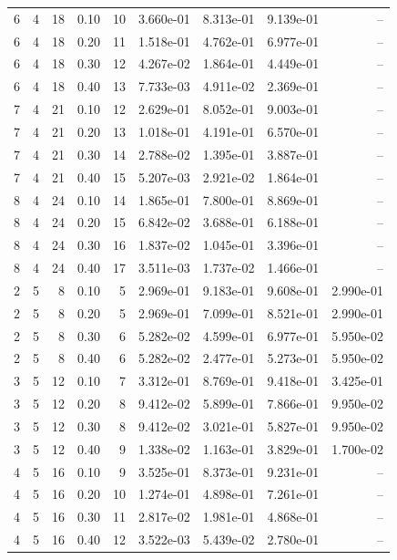 \begin{landscape}
\begin{longtable}{rrrrrrrrr}
6 & 4 & 18 & 0.10 & 10 & 3.660e-01 & 8.313e-01 & 9.139e-01 & -- \\
6 & 4 & 18 & 0.20 & 11 & 1.518e-01 & 4.762e-01 & 6.977e-01 & -- \\
6 & 4 & 18 & 0.30 & 12 & 4.267e-02 & 1.864e-01 & 4.449e-01 & -- \\
6 & 4 & 18 & 0.40 & 13 & 7.733e-03 & 4.911e-02 & 2.369e-01 & -- \\
7 & 4 & 21 & 0.10 & 12 & 2.629e-01 & 8.052e-01 & 9.003e-01 & -- \\
7 & 4 & 21 & 0.20 & 13 & 1.018e-01 & 4.191e-01 & 6.570e-01 & -- \\
7 & 4 & 21 & 0.30 & 14 & 2.788e-02 & 1.395e-01 & 3.887e-01 & -- \\
7 & 4 & 21 & 0.40 & 15 & 5.207e-03 & 2.921e-02 & 1.864e-01 & -- \\
8 & 4 & 24 & 0.10 & 14 & 1.865e-01 & 7.800e-01 & 8.869e-01 & -- \\
8 & 4 & 24 & 0.20 & 15 & 6.842e-02 & 3.688e-01 & 6.188e-01 & -- \\
8 & 4 & 24 & 0.30 & 16 & 1.837e-02 & 1.045e-01 & 3.396e-01 & -- \\
8 & 4 & 24 & 0.40 & 17 & 3.511e-03 & 1.737e-02 & 1.466e-01 & -- \\
2 & 5 & 8 & 0.10 & 5 & 2.969e-01 & 9.183e-01 & 9.608e-01 & 2.990e-01 \\
2 & 5 & 8 & 0.20 & 5 & 2.969e-01 & 7.099e-01 & 8.521e-01 & 2.990e-01 \\
2 & 5 & 8 & 0.30 & 6 & 5.282e-02 & 4.599e-01 & 6.977e-01 & 5.950e-02 \\
2 & 5 & 8 & 0.40 & 6 & 5.282e-02 & 2.477e-01 & 5.273e-01 & 5.950e-02 \\
3 & 5 & 12 & 0.10 & 7 & 3.312e-01 & 8.769e-01 & 9.418e-01 & 3.425e-01 \\
3 & 5 & 12 & 0.20 & 8 & 9.412e-02 & 5.899e-01 & 7.866e-01 & 9.950e-02 \\
3 & 5 & 12 & 0.30 & 8 & 9.412e-02 & 3.021e-01 & 5.827e-01 & 9.950e-02 \\
3 & 5 & 12 & 0.40 & 9 & 1.338e-02 & 1.163e-01 & 3.829e-01 & 1.700e-02 \\
4 & 5 & 16 & 0.10 & 9 & 3.525e-01 & 8.373e-01 & 9.231e-01 & -- \\
4 & 5 & 16 & 0.20 & 10 & 1.274e-01 & 4.898e-01 & 7.261e-01 & -- \\
4 & 5 & 16 & 0.30 & 11 & 2.817e-02 & 1.981e-01 & 4.868e-01 & -- \\
4 & 5 & 16 & 0.40 & 12 & 3.522e-03 & 5.439e-02 & 2.780e-01 & -- \\

\end{longtable}
\end{landscape}
